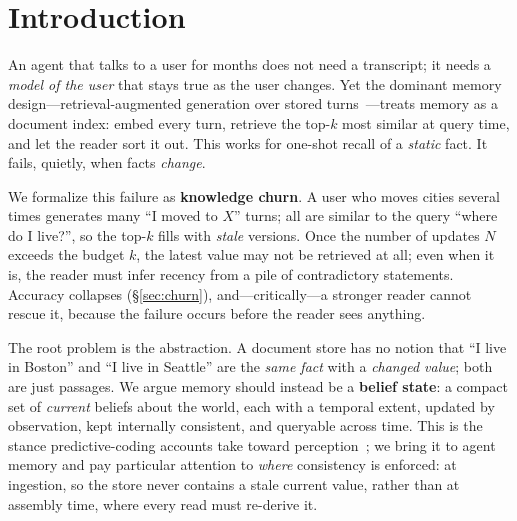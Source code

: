 \documentclass[11pt]{article}
\newcommand{\tenet}{\textsc{Tenet}}
\newcommand{\ci}[2]{{\footnotesize[#1,\,#2]}}
\begin{document}
\begin{abstract}
never calls an LLM, and beats every published memory framework on EventQA ($70.7$ vs $67.6$; Wilson CI excludes);
on MemoryAgentBench \textsc{Test-Time Learning} it pools $77.2$ \ci{73.3}{80.7}
($n{=}500$), above BM25 ($75.4$) and every published memory system (Zep $62.8$,
Mem0 $32.4$) on a weaker, zero-cost local 7B reader.
Run head-to-head against a released memory framework as a black box (ReMe, its own
ingest-and-retrieve pipeline end-to-end, identical reader and judge), \tenet{} scores
$67.0\%$ vs ReMe's $34.0\%$ on LongMemEval\_S ($n{=}100$, $p\approx2\times10^{-6}$).
All numbers are reproducible from released code with official metrics and prompts verbatim.
\end{abstract}

\section{Introduction}
An agent that talks to a user for months does not need a transcript; it needs a
\emph{model of the user} that stays true as the user changes. Yet the dominant memory
design---retrieval-augmented generation over stored turns~\cite{mem0,longmemeval}---treats
memory as a document index: embed every turn, retrieve the top-$k$ most similar at query
time, and let the reader sort it out. This works for one-shot recall of a \emph{static}
fact. It fails, quietly, when facts \emph{change}.

We formalize this failure as \textbf{knowledge churn}. A user who moves cities several
times generates many ``I moved to $X$'' turns; all are similar to the query ``where do I
live?'', so the top-$k$ fills with \emph{stale} versions. Once the number of updates $N$
exceeds the budget $k$, the latest value may not be retrieved at all; even when it is, the
reader must infer recency from a pile of contradictory statements. Accuracy collapses
(\S\ref{sec:churn}), and---critically---a stronger reader cannot rescue it, because the
failure occurs before the reader sees anything.

The root problem is the abstraction. A document store has no notion that ``I live in
Boston'' and ``I live in Seattle'' are the \emph{same fact} with a \emph{changed value};
both are just passages. We argue memory should instead be a \textbf{belief state}: a
compact set of \emph{current} beliefs about the world, each with a temporal extent,
updated by observation, kept internally consistent, and queryable across time. This is
the stance predictive-coding accounts take toward
perception~\cite{friston}; we bring it to agent memory and pay particular attention to
\emph{where} consistency is enforced: at ingestion, so the store never contains a stale
current value, rather than at assembly time, where every read must re-derive it.
\end{document}
